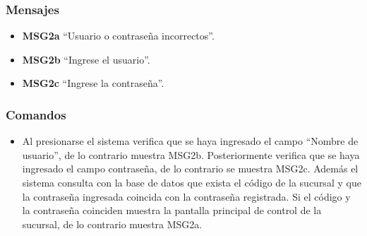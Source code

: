 \documentclass[oneside,10pt]{book}
\begin{document}
\subsubsection{Mensajes}
\begin{itemize}
	\item {\bf MSG2a} ``Usuario o contraseña incorrectos''.
	\item {\bf MSG2b} ``Ingrese el usuario''.
	\item {\bf MSG2c} ``Ingrese la contraseña''.
\end{itemize}

\subsubsection{Comandos}
\begin{itemize}
	\item {} Al presionarse el sistema verifica que se haya ingresado el campo ``Nombre de usuario'', de lo contrario muestra MSG2b. Posteriormente verifica que se haya ingresado el campo contraseña, de lo contrario se muestra MSG2c. Además el sistema consulta con la base de datos que exista el código de la sucursal y que la contraseña ingresada coincida con la contraseña registrada. Si el código y la contraseña coinciden muestra la pantalla principal de control de la sucursal, de lo contrario muestra MSG2a.
\end{itemize}
\end{document}
